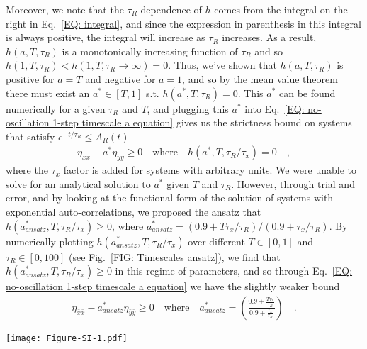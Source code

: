 \documentclass[%
 reprint,
superscriptaddress,
%
%
%
%
%
%
%
%
%
 amsmath,amssymb,
 aps,
%
%
%
%
%
%
onecolumn]{revtex4-2}
\begin{document}
Moreover, we note that the $\tau_{R}$ dependence of $h$ comes from the integral on the right in Eq.~\eqref{EQ: integral}, and since the expression in parenthesis in this integral is always positive, the integral will increase as $\tau_{R}$ increases. As a result, $h(a,T,\tau_{R})$ is a monotonically increasing function of $\tau_{R}$ and so $h(1,T,\tau_{R}) < h(1,T, \tau_{R} \to \infty) = 0$. Thus, we've shown that $h(a,T,\tau_{R})$ is positive for $a = T$ and negative for $a = 1$, and so by the mean value theorem there must exist an $a^{*}\in [T,1]$ s.t. $h(a^{*},T,\tau_{R}) = 0$. This $a^{*}$ can be found numerically for a given $\tau_{R}$ and $T$, and plugging this $a^{*}$ into Eq.~\eqref{EQ: no-oscillation 1-step timescale a equation} gives us the strictness bound on systems that satisfy $e^{-t/\tau_{R}} \leq A_{R}(t)$
\begin{align}
    \eta_{\bar{x}\bar{x}} - a^{*}\eta_{\bar{y}\bar{y}} \geq 0 \quad \text{where} \quad h(a^{*},T,\tau_{R}/\tau_{x}) = 0\quad ,
\end{align}
where the $\tau_{x}$ factor is added for systems with arbitrary units. We were unable to solve for an analytical solution to $a^{*}$ given $T$ and $\tau_{R}$. However, through trial and error, and by looking at the functional form of the solution of systems with exponential auto-correlations, we proposed the ansatz that $h(a^{*}_{ansatz},T,\tau_{R}/\tau_{x}) \geq 0$, where $a^{*}_{ansatz} =  (0.9 + T\tau_{x}/\tau_{R})/(0.9 + \tau_{x}/\tau_{R})$. By numerically plotting $h(a^{*}_{ansatz},T,\tau_{R}/\tau_{x})$ over different $T \in [0,1]$ and $\tau_{R} \in [0,100]$ (see Fig.~\ref{FIG: Timescales ansatz}), we find that $h(a^{*}_{ansatz},T,\tau_{R}/\tau_{x}) \geq 0$ in this regime of parameters, and so through Eq.~\eqref{EQ: no-oscillation 1-step timescale a equation} we have the slightly weaker bound
\begin{align}
    \eta_{\bar{x}\bar{x}} - a^{*}_{ansatz}\eta_{\bar{y}\bar{y}} \geq 0 \quad \text{where} \quad a^{*}_{ansatz} = \left( \frac{0.9 + \frac{T\tau_{x}}{\tau_{R}}}{0.9 + \frac{\tau_{x}}{\tau_{R}}}\right) \quad .
\end{align}

\begin{figure*}[htb!]
\vspace{-0.4cm}
\centering
  \texttt{[image: Figure-SI-1.pdf]}
   \caption{Plot of $h(a^{*}_{ansatz},T,\tau_{R}/\tau_{x})$ over different $T$ and $\tau_{R}/\tau_{x}$ values, where $a^{*}_{ansatz} = (0.9+ T\frac{\tau_{x}}{\tau_{R}})/(0.9 + \frac{\tau_{x}}{\tau_{R}})$. Note that $h$ here is always positive and for most values of the domain it is approximately zero (the peak is $h_{max} \approx 0.02$).}
    \label{FIG: Timescales ansatz}
\end{figure*}
\end{document}
